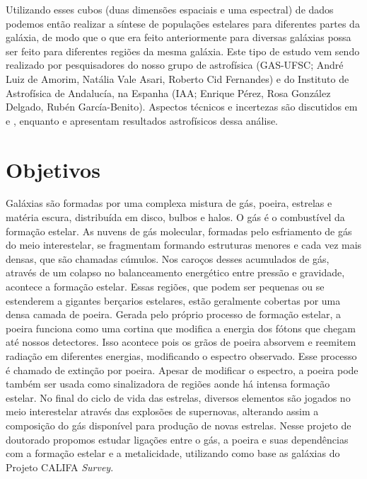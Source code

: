 \documentclass[a4paper,12pt]{article}
\begin{document}
Utilizando esses cubos (duas dimensões espaciais e uma espectral) de dados podemos então realizar a
síntese de populações estelares para diferentes partes da galáxia, de modo que o que era feito
anteriormente para diversas galáxias possa ser feito para diferentes regiões da mesma galáxia. Este
tipo de estudo vem sendo realizado por pesquisadores do nosso grupo de astrofísica (GAS-UFSC; André
Luiz de Amorim, Natália Vale Asari, Roberto Cid Fernandes) e do Instituto de Astrofísica de
Andalucía, na Espanha (IAA; Enrique Pérez, Rosa González Delgado, Rubén García-Benito). Aspectos
técnicos e incertezas são discutidos em \citet{CidFernandes.etal.2013a} e
\citet{CidFernandes.etal.2014a}, enquanto \citet{Perez.etal.2013a} e
\citet{GonzalezDelgado.etal.2014a} apresentam resultados astrofísicos dessa análise.

\section{Objetivos}
\vspace{0.3cm}

Galáxias são formadas por uma complexa mistura de gás, poeira, estrelas e matéria escura,
distribuída em disco, bulbos e halos. O gás é o combustível da formação estelar. As nuvens de gás
molecular, formadas pelo esfriamento de gás do meio interestelar, se fragmentam formando estruturas
menores e cada vez mais densas, que são chamadas cúmulos. Nos caroços desses acumulados de gás,
através de um colapso no balanceamento energético entre pressão e gravidade, acontece a formação
estelar. Essas regiões, que podem ser pequenas ou se estenderem a gigantes berçarios estelares,
estão geralmente cobertas por uma densa camada de poeira. Gerada pelo próprio processo de formação
estelar, a poeira funciona como uma cortina que modifica a energia dos fótons que chegam até nossos
detectores. Isso acontece pois os grãos de poeira absorvem e reemitem radiação em diferentes
energias, modificando o espectro observado. Esse processo é chamado de extinção por poeira. Apesar
de modificar o espectro, a poeira pode também ser usada como sinalizadora de regiões aonde há
intensa formação estelar. No final do ciclo de vida das estrelas, diversos elementos são jogados no
meio interestelar através das explosões de supernovas, alterando assim a composição do gás
disponível para produção de novas estrelas. Nesse projeto de doutorado propomos estudar ligações
entre o gás, a poeira e suas dependências com a formação estelar e a metalicidade, utilizando como
base as galáxias do Projeto CALIFA {\em Survey}.
\end{document}
